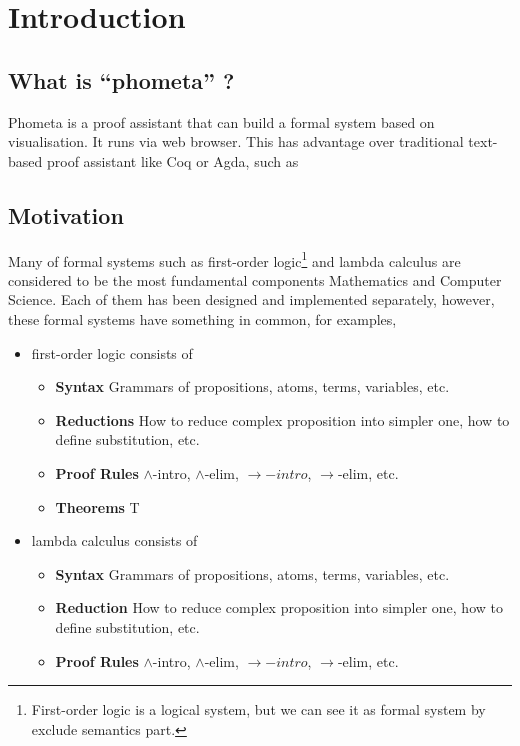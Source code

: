 

\chapter{Introduction}

\section{What is ``phometa'' ?}

Phometa is a proof assistant that can build a formal system based on visualisation. It runs via web browser. This has advantage over traditional text-based proof assistant like Coq or Agda, such as


\section{Motivation}
Many of formal systems such as first-order logic\footnote{First-order logic is a logical system, but we can see it as formal system by exclude semantics part.} and lambda calculus are considered to be the most fundamental components Mathematics and Computer Science. Each of them has been designed and implemented separately, however, these formal systems have something in common, for examples,

\begin{itemize}
  \item first-order logic consists of
  \begin{itemize}%
      \item \textbf{Syntax} Grammars of propositions, atoms, terms, variables, etc.
      \item \textbf{Reductions} How to reduce complex proposition into simpler one, how to define substitution, etc.
      \item \textbf{Proof Rules} $\wedge$-intro, $\wedge$-elim, $\rightarrow-intro$, $\rightarrow$-elim, etc.
      \item \textbf{Theorems} T
  \end{itemize}
  \item lambda calculus consists of
  \begin{itemize}%
      \item \textbf{Syntax} Grammars of propositions, atoms, terms, variables, etc.
      \item \textbf{Reduction} How to reduce complex proposition into simpler one, how to define substitution, etc.
      \item \textbf{Proof Rules} $\wedge$-intro, $\wedge$-elim, $\rightarrow-intro$, $\rightarrow$-elim, etc.
  \end{itemize}
\end{itemize}

